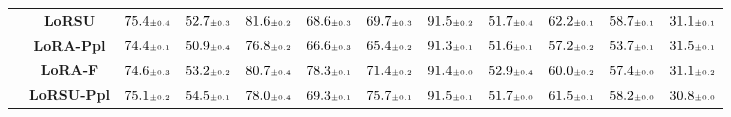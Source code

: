 \begin{table}
\begin{center}
\begin{small}
\begin{tabular}{l c c c c c c c c c c c}
& \textbf{LoRSU} & $75.4 \mtiny{\pm 0.4}$ & $52.7 \mtiny{\pm 0.3}$ & $81.6 \mtiny{\pm 0.2}$ & $68.6 \mtiny{\pm 0.3}$ & $69.7 \mtiny{\pm 0.3}$ & $91.5 \mtiny{\pm 0.2}$ & $51.7 \mtiny{\pm 0.4}$ & $62.2 \mtiny{\pm 0.1}$ & $58.7 \mtiny{\pm 0.1}$ & $31.1 \mtiny{\pm 0.1}$ \\
& \textbf{LoRA-Ppl} & $74.4 \mtiny{\pm 0.1}$ & $50.9 \mtiny{\pm 0.4}$ & $76.8 \mtiny{\pm 0.2}$ & $66.6 \mtiny{\pm 0.3}$ & $65.4 \mtiny{\pm 0.2}$ & $91.3 \mtiny{\pm 0.1}$ & $51.6 \mtiny{\pm 0.1}$ & $57.2 \mtiny{\pm 0.2}$ & $53.7 \mtiny{\pm 0.1}$ & $31.5 \mtiny{\pm 0.1}$ \\
& \textbf{LoRA-F} & $74.6 \mtiny{\pm 0.3}$ & $53.2 \mtiny{\pm 0.2}$ & $80.7 \mtiny{\pm 0.4}$ & $78.3 \mtiny{\pm 0.1}$ & $71.4 \mtiny{\pm 0.2}$ & $91.4 \mtiny{\pm 0.0}$ & $52.9 \mtiny{\pm 0.4}$ & $60.0 \mtiny{\pm 0.2}$ & $57.4 \mtiny{\pm 0.0}$ & $31.1 \mtiny{\pm 0.2}$ \\
& \textbf{LoRSU-Ppl} & $75.1 \mtiny{\pm 0.2}$ & $54.5 \mtiny{\pm 0.1}$ & $78.0 \mtiny{\pm 0.4}$ & $69.3 \mtiny{\pm 0.1}$ & $75.7 \mtiny{\pm 0.1}$ & $91.5 \mtiny{\pm 0.1}$ & $51.7 \mtiny{\pm 0.0}$ & $61.5 \mtiny{\pm 0.1}$ & $58.2 \mtiny{\pm 0.0}$ & $30.8 \mtiny{\pm 0.0}$ \\
\bottomrule
\end{tabular}
\endgroup
\end{small}
\end{center}
\vskip -0.1in
\end{table}


